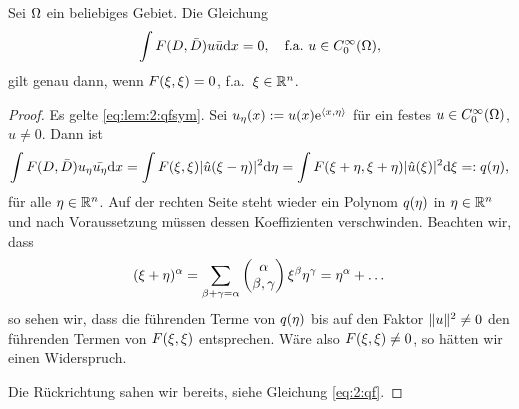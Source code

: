 \begin{lem}\label{lem:2:qfsym}
Sei $\Omega$ ein beliebiges Gebiet.
Die Gleichung
\begin{equation}\label{eq:lem:2:qfsym}
\int F(D,\bar{D})u\bar{u}\mathrm{d} x=0,
\quad\text{f.a.}~u\in C^\infty_0(\Omega),
\end{equation}
gilt genau dann, wenn $F(\xi,\xi)=0$, f.a.~$\xi\in\mathbb R^n$.
\end{lem}
\begin{proof}
Es gelte \eqref{eq:lem:2:qfsym}.
Sei $u_\eta(x):=u(x)\mathrm e^{\langle x,\eta\rangle}$ für ein festes $u\in C^\infty_0(\Omega)$, $u\neq0$.
Dann ist
\begin{equation}
\int F(D,\bar{D})u_\eta\bar{u_\eta}\mathrm{d} x=\int F(\xi,\xi)\lvert\hat{u}(\xi-\eta)\rvert^2\mathrm{d} \eta=\int F(\xi+\eta,\xi+\eta)\lvert\hat{u}(\xi)\rvert^2\mathrm{d}\xi=:q(\eta),
\end{equation}
für alle $\eta\in\mathbb R^n$.
Auf der rechten Seite steht wieder ein Polynom $q(\eta)$ in $\eta\in\mathbb R^n$
und nach Voraussetzung müssen dessen Koeffizienten verschwinden.
Beachten wir, dass
\begin{equation}
(\xi+\eta)^\alpha=\sum_{\beta+\gamma=\alpha}\begin{pmatrix}\alpha\\\beta,\gamma\end{pmatrix}\xi^\beta\eta^\gamma=\eta^\alpha+\dots
\end{equation}
so sehen wir, dass die führenden Terme von $q(\eta)$
bis auf den Faktor $\lVert u\rVert^2\neq0$ den führenden Termen von $F(\xi,\xi)$ entsprechen.
Wäre also $F(\xi,\xi)\neq0$, so hätten wir einen Widerspruch.

Die Rückrichtung sahen wir bereits, siehe Gleichung \eqref{eq:2:qf}.
\end{proof}

